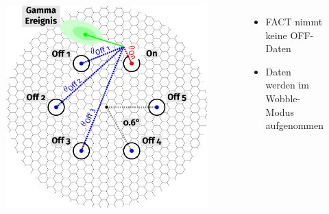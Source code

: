 \documentclass[aspectratio=1610, professionalfonts, 9pt]{beamer}
\begin{document}
\begin{frame}
  \begin{columns}[onlytextwidth]
	\begin{figure}
	  \centering
	  \includegraphics[height=0.8\textheight]{./tikz/Wobble/Wobble.pdf}
	\end{figure}
	\begin{itemize}
	  \item FACT nimmt keine OFF-Daten
	  \item Daten werden im Wobble-Modus aufgenommen
	\end{itemize}
  \end{columns}
\end{frame}
\end{document}
